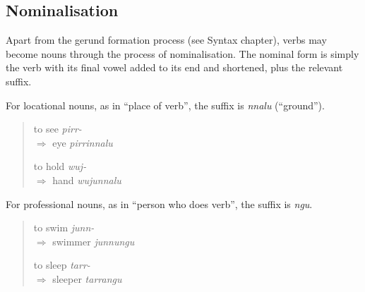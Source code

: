 \subsection{Nominalisation}

Apart from the gerund formation process (see Syntax chapter), verbs may become
nouns through the process of nominalisation. The nominal form is simply the verb
with its final vowel added to its end and shortened, plus the relevant suffix.

For locational nouns, as in ``place of verb'', the suffix is \textit{nnalu} (``ground'').

\begin{quote}
\begin{multicols}{2}
to see \textit{pirr-}\\
$\Rightarrow$ eye \textit{pirrinnalu}

to hold \textit{wuj-}\\
$\Rightarrow$ hand \textit{wujunnalu}
\end{multicols}
\end{quote}

For professional nouns, as in ``person who does verb'', the suffix is
\textit{ngu}.

\begin{quote}
\begin{multicols}{2}
to swim \textit{junn-}\\
$\Rightarrow$ swimmer \textit{junnungu}

to sleep \textit{tarr-}\\
$\Rightarrow$ sleeper \textit{tarrangu}
\end{multicols}
\end{quote}

